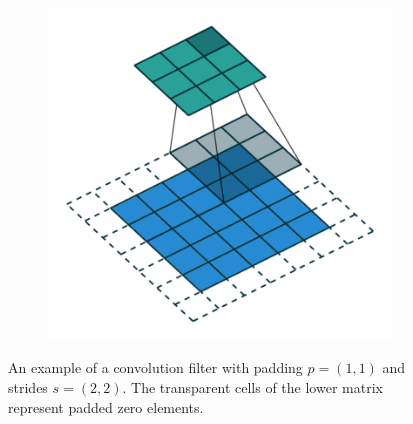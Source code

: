 \begin{figure}[h!]
\begin{subfigure}[b]{0.32\textwidth}
  \end{subfigure}
  \begin{subfigure}[b]{0.32\textwidth}
    \includegraphics[width=\textwidth]{figures/padding_strides_02}
  \end{subfigure}
  \caption{An example of a convolution filter with padding $p=(1,1)$ and strides $s = (2,2)$. The transparent cells of the lower matrix represent padded zero elements.}
  \label{fig:conv_padding_strides}
\end{figure}

